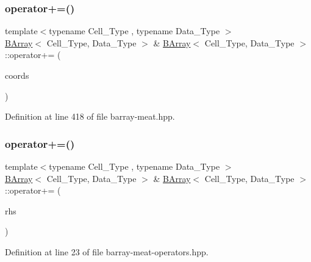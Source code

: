 \subsubsection{\texorpdfstring{operator+=()}{operator+=()}\hspace{0.1cm}{\footnotesize\ttfamily [1/3]}}
{\footnotesize\ttfamily template$<$typename Cell\+\_\+\+Type , typename Data\+\_\+\+Type $>$ \\
\hyperlink{class_b_array}{B\+Array}$<$ Cell\+\_\+\+Type, Data\+\_\+\+Type $>$ \& \hyperlink{class_b_array}{B\+Array}$<$ Cell\+\_\+\+Type, Data\+\_\+\+Type $>$\+::operator+= (\begin{DoxyParamCaption}\item[{const std\+::pair$<$ \hyperlink{typedefs_8hpp_a91ad9478d81a7aaf2593e8d9c3d06a14}{uint}, \hyperlink{typedefs_8hpp_a91ad9478d81a7aaf2593e8d9c3d06a14}{uint} $>$ \&}]{coords }\end{DoxyParamCaption})\hspace{0.3cm}{\ttfamily [inline]}}



Definition at line 418 of file barray-\/meat.\+hpp.

\mbox{\label{class_b_array_a503eb705e9a3996046ee4ca339d611de}} 
\subsubsection{\texorpdfstring{operator+=()}{operator+=()}\hspace{0.1cm}{\footnotesize\ttfamily [2/3]}}
{\footnotesize\ttfamily template$<$typename Cell\+\_\+\+Type , typename Data\+\_\+\+Type $>$ \\
\hyperlink{class_b_array}{B\+Array}$<$ Cell\+\_\+\+Type, Data\+\_\+\+Type $>$ \& \hyperlink{class_b_array}{B\+Array}$<$ Cell\+\_\+\+Type, Data\+\_\+\+Type $>$\+::operator+= (\begin{DoxyParamCaption}\item[{const \hyperlink{class_b_array}{B\+Array}$<$ Cell\+\_\+\+Type, Data\+\_\+\+Type $>$ \&}]{rhs }\end{DoxyParamCaption})\hspace{0.3cm}{\ttfamily [inline]}}



Definition at line 23 of file barray-\/meat-\/operators.\+hpp.

\mbox{\label{class_b_array_a522368274c3283661dc7a02c50cc09cf}} 
